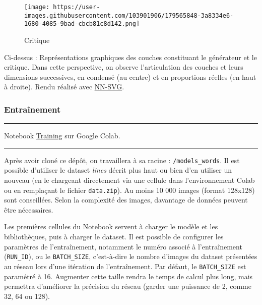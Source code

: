 \documentclass[
]{article}
\begin{document}
\begin{figure}
\centering
\texttt{[image: https://user-images.githubusercontent.com/103901906/179565848-3a8334e6-1680-4085-9bad-cbcb81c8d142.png]}
\caption{Critique}
\end{figure}

Ci-dessus : Représentations graphiques des couches constituant le générateur et le critique. Dans cette perspective, on observe l'articulation des couches et leurs dimensions successives, en condensé (au centre) et en proportions réelles (en haut à droite). Rendu réalisé avec \href{https://github.com/alexlenail/NN-SVG}{NN-SVG}.

\hypertarget{entrauxeenement}{%
\subsubsection{Entraînement}\label{entrauxeenement}}

\begin{center}\rule{0.5\linewidth}{0.5pt}\end{center}

Notebook \href{https://colab.research.google.com/drive/12WCzKlR--V8E7HMZHJ89nobVDCknCKmE\#scrollTo=C7vmECVpwSZm}{Training} sur Google Colab.

\begin{center}\rule{0.5\linewidth}{0.5pt}\end{center}

Après avoir cloné ce dépôt, on travaillera à sa racine : \texttt{/models\_words}. Il est possible d'utiliser le dataset \emph{lines} décrit plus haut ou bien d'en utiliser un nouveau (en le chargeant directement via une cellule dans l'environnement Colab ou en remplaçant le fichier \texttt{data.zip}). Au moins 10 000 images (format 128x128) sont conseillées. Selon la complexité des images, davantage de données peuvent être nécessaires.

Les premières cellules du Notebook servent à charger le modèle et les bibliothèques, puis à charger le dataset. Il est possible de configurer les paramètres de l'entraînement, notamment le numéro associé à l'entraînement (\texttt{RUN\_ID}), ou le \texttt{BATCH\_SIZE}, c'est-à-dire le nombre d'images du dataset présentées au réseau lors d'une itération de l'entraînement. Par défaut, le \texttt{BATCH\_SIZE} est paramétré à 16. Augmenter cette taille rendra le temps de calcul plus long, mais permettra d'améliorer la précision du réseau (garder une puissance de 2, comme 32, 64 ou 128).
\end{document}
